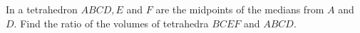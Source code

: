 In a tetrahedron $ABCD, E$ and $F$ are the midpoints of the medians from $A$ and $D$. Find the ratio of the volumes of tetrahedra $BCEF$ and $ABCD$.